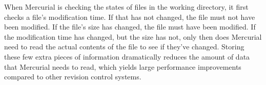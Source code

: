 When Mercurial is checking the states of files in the working
directory, it first checks a file's modification time.  If that has
not changed, the file must not have been modified.  If the file's size
has changed, the file must have been modified.  If the modification
time has changed, but the size has not, only then does Mercurial need
to read the actual contents of the file to see if they've changed.
Storing these few extra pieces of information dramatically reduces the
amount of data that Mercurial needs to read, which yields large
performance improvements compared to other revision control systems.

